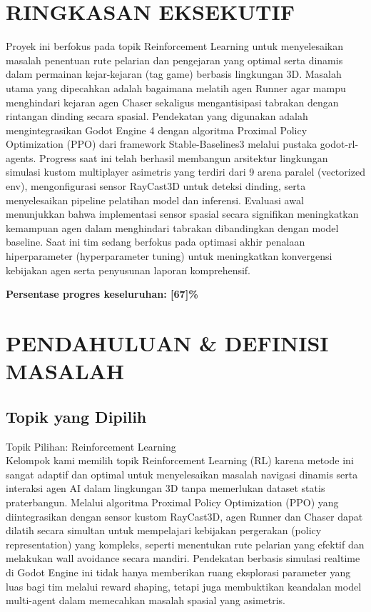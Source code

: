 \documentclass[12pt,a4paper]{article}
\begin{document}
\section*{RINGKASAN EKSEKUTIF}

Proyek ini berfokus pada topik Reinforcement Learning untuk menyelesaikan masalah penentuan rute pelarian dan pengejaran yang optimal serta dinamis dalam permainan kejar-kejaran (tag game) berbasis lingkungan 3D. Masalah utama yang dipecahkan adalah bagaimana melatih agen Runner agar mampu menghindari kejaran agen Chaser sekaligus mengantisipasi tabrakan dengan rintangan dinding secara spasial. Pendekatan yang digunakan adalah mengintegrasikan Godot Engine 4 dengan algoritma Proximal Policy Optimization (PPO) dari framework Stable-Baselines3 melalui pustaka godot-rl-agents. Progress saat ini telah berhasil membangun arsitektur lingkungan simulasi kustom multiplayer asimetris yang terdiri dari 9 arena paralel (vectorized env), mengonfigurasi sensor RayCast3D untuk deteksi dinding, serta menyelesaikan pipeline pelatihan model dan inferensi. Evaluasi awal menunjukkan bahwa implementasi sensor spasial secara signifikan meningkatkan kemampuan agen dalam menghindari tabrakan dibandingkan dengan model baseline. Saat ini tim sedang berfokus pada optimasi akhir penalaan hiperparameter (hyperparameter tuning) untuk meningkatkan konvergensi kebijakan agen serta penyusunan laporan komprehensif.


\textbf{Persentase progres keseluruhan: [67]\%}

\newpage

\section{PENDAHULUAN \& DEFINISI MASALAH}

\subsection{Topik yang Dipilih}
Topik Pilihan: Reinforcement Learning \\

Kelompok kami memilih topik Reinforcement Learning (RL) karena metode ini sangat adaptif dan optimal untuk menyelesaikan masalah navigasi dinamis serta interaksi agen AI dalam lingkungan 3D tanpa memerlukan dataset statis praterbangun. Melalui algoritma Proximal Policy Optimization (PPO) yang diintegrasikan dengan sensor kustom RayCast3D, agen Runner dan Chaser dapat dilatih secara simultan untuk mempelajari kebijakan pergerakan (policy representation) yang kompleks, seperti menentukan rute pelarian yang efektif dan melakukan wall avoidance secara mandiri. Pendekatan berbasis simulasi realtime di Godot Engine ini tidak hanya memberikan ruang eksplorasi parameter yang luas bagi tim melalui reward shaping, tetapi juga membuktikan keandalan model multi-agent dalam memecahkan masalah spasial yang asimetris.
\end{document}
